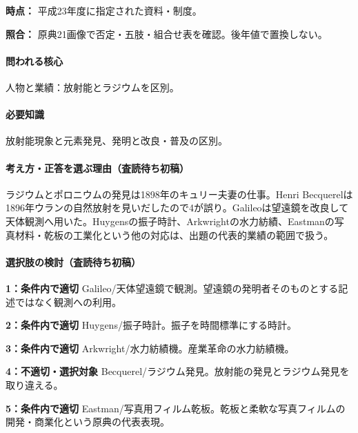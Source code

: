 \noindent\textbf{時点：} 平成23年度に指定された資料・制度。\par

\noindent\textbf{照合：} 原典21画像で否定・五肢・組合せ表を確認。後年値で置換しない。\par

\paragraph{問われる核心} 人物と業績：放射能とラジウムを区別。

\paragraph{必要知識} 放射能現象と元素発見、発明と改良・普及の区別。

\paragraph{考え方・正答を選ぶ理由（査読待ち初稿）} ラジウムとポロニウムの発見は1898年のキュリー夫妻の仕事。Henri Becquerelは1896年ウランの自然放射を見いだしたので4が誤り。Galileoは望遠鏡を改良して天体観測へ用いた。Huygensの振子時計、Arkwrightの水力紡績、Eastmanの写真材料・乾板の工業化という他の対応は、出題の代表的業績の範囲で扱う。

\paragraph{選択肢の検討（査読待ち初稿）}\mbox{}\par

\noindent\textbf{1：条件内で適切} Galileo/天体望遠鏡で観測。望遠鏡の発明者そのものとする記述ではなく観測への利用。\par

\noindent\textbf{2：条件内で適切} Huygens/振子時計。振子を時間標準にする時計。\par

\noindent\textbf{3：条件内で適切} Arkwright/水力紡績機。産業革命の水力紡績機。\par

\noindent\textbf{4：不適切・選択対象} Becquerel/ラジウム発見。放射能の発見とラジウム発見を取り違える。\par

\noindent\textbf{5：条件内で適切} Eastman/写真用フィルム乾板。乾板と柔軟な写真フィルムの開発・商業化という原典の代表表現。\par

